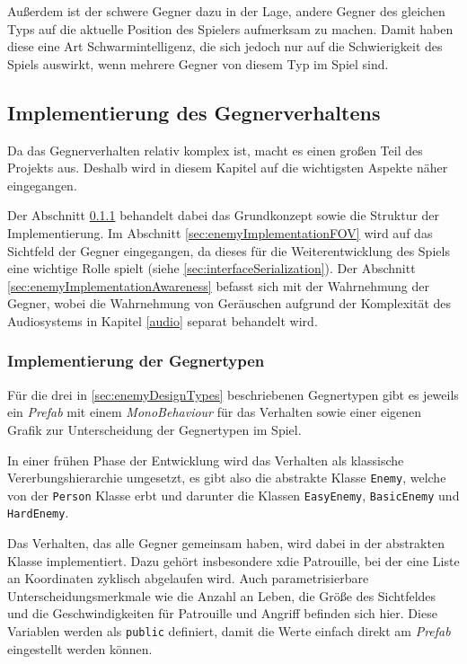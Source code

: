 Außerdem ist der schwere Gegner dazu in der Lage, andere Gegner des gleichen Typs auf die aktuelle Position des Spielers aufmerksam zu machen. Damit haben diese eine Art Schwarmintelligenz, die sich jedoch nur auf die Schwierigkeit des Spiels auswirkt, wenn mehrere Gegner von diesem Typ im Spiel sind.

\subsection{Implementierung des Gegnerverhaltens}
\label{sec:enemyImplementation}

Da das Gegnerverhalten relativ komplex ist, macht es einen großen Teil des Projekts aus. Deshalb wird in diesem Kapitel auf die wichtigsten Aspekte näher eingegangen.

Der Abschnitt \ref{sec:enemyImplementationTypes} behandelt dabei das Grundkonzept sowie die Struktur der Implementierung. Im Abschnitt \ref{sec:enemyImplementationFOV} wird auf das Sichtfeld der Gegner eingegangen, da dieses für die Weiterentwicklung des Spiels eine wichtige Rolle spielt (siehe \ref{sec:interfaceSerialization}). Der Abschnitt \ref{sec:enemyImplementationAwareness} befasst sich mit der Wahrnehmung der Gegner, wobei die Wahrnehmung von Geräuschen aufgrund der Komplexität des Audiosystems in Kapitel \ref{audio} separat behandelt wird.

\subsubsection{Implementierung der Gegnertypen}
\label{sec:enemyImplementationTypes}

Für die drei in \ref{sec:enemyDesignTypes} beschriebenen Gegnertypen gibt es jeweils ein \textit{Prefab} mit einem \textit{MonoBehaviour} für das Verhalten sowie einer eigenen Grafik zur Unterscheidung der Gegnertypen im Spiel.

In einer frühen Phase der Entwicklung wird das Verhalten als klassische Vererbungshierarchie umgesetzt, es gibt also die abstrakte Klasse \texttt{Enemy}, welche von der \texttt{Person} Klasse erbt und darunter die Klassen \texttt{EasyEnemy}, \texttt{BasicEnemy} und \texttt{HardEnemy}.

Das Verhalten, das alle Gegner gemeinsam haben, wird dabei in der abstrakten Klasse implementiert. Dazu gehört insbesondere xdie Patrouille, bei der eine Liste an Koordinaten zyklisch abgelaufen wird. Auch parametrisierbare Unterscheidungsmerkmale wie die Anzahl an Leben, die Größe des Sichtfeldes und die Geschwindigkeiten für Patrouille und Angriff befinden sich hier. Diese Variablen werden als \texttt{public} definiert, damit die Werte einfach direkt am \textit{Prefab} eingestellt werden können.

